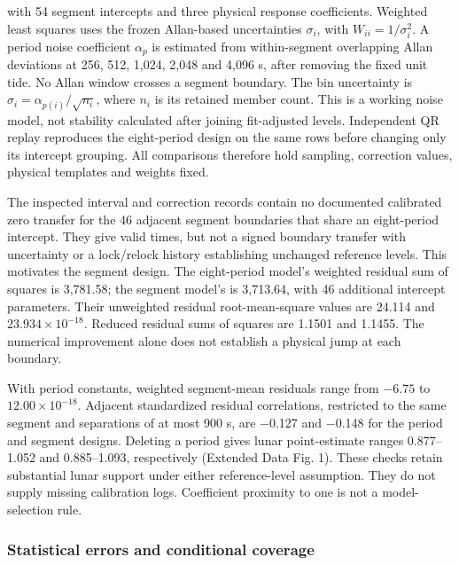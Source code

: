 \documentclass[
  10pt,
  a4paper,
]{article}
\begin{document}
with 54 segment intercepts and three physical response coefficients.
Weighted least squares uses the frozen Allan-based uncertainties
\(\sigma_i\), with \(W_{ii}=1/\sigma_i^2\). A period noise coefficient
\(\alpha_p\) is estimated from within-segment overlapping Allan
deviations at 256, 512, 1,024, 2,048 and 4,096 s, after removing the
fixed unit tide. No Allan window crosses a segment boundary. The bin
uncertainty is \(\sigma_i=\alpha_{p(i)}/\sqrt{n_i}\), where \(n_i\) is
its retained member count. This is a working noise model, not stability
calculated after joining fit-adjusted levels. Independent QR replay
reproduces the eight-period design on the same rows before changing only
its intercept grouping. All comparisons therefore hold sampling,
correction values, physical templates and weights fixed.

The inspected interval and correction records contain no documented
calibrated zero transfer for the 46 adjacent segment boundaries that
share an eight-period intercept. They give valid times, but not a signed
boundary transfer with uncertainty or a lock/relock history establishing
unchanged reference levels. This motivates the segment design. The
eight-period model's weighted residual sum of squares is 3,781.58; the
segment model's is 3,713.64, with 46 additional intercept parameters.
Their unweighted residual root-mean-square values are 24.114 and
\(23.934\times10^{-18}\). Reduced residual sums of squares are 1.1501
and 1.1455. The numerical improvement alone does not establish a
physical jump at each boundary.

With period constants, weighted segment-mean residuals range from
\(-6.75\) to \(12.00\times10^{-18}\). Adjacent standardized residual
correlations, restricted to the same segment and separations of at most
900 s, are −0.127 and −0.148 for the period and segment designs.
Deleting a period gives lunar point-estimate ranges 0.877--1.052 and
0.885--1.093, respectively (Extended Data Fig. 1). These checks retain
substantial lunar support under either reference-level assumption. They
do not supply missing calibration logs. Coefficient proximity to one is
not a model-selection rule.

\hypertarget{statistical-errors-and-conditional-coverage}{%
\subsubsection{Statistical errors and conditional
coverage}\label{statistical-errors-and-conditional-coverage}}
\end{document}
